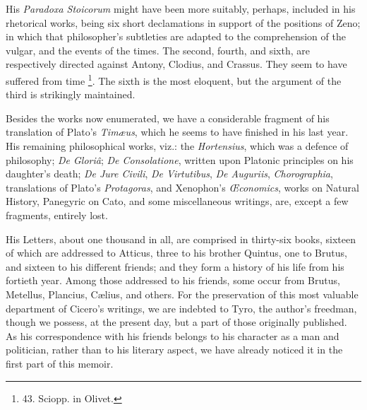 His \emph{Paradoxa Stoicorum}
might have been more suitably, perhaps, included in his rhetorical
works, being six short declamations in support of the positions of
Zeno; in which that philosopher's subtleties are adapted to the
comprehension of the vulgar, and the events of the times. The second,
fourth, and sixth, are respectively directed against Antony, Clodius,
and Crassus. They seem to have suffered from time \footnote{43.
Sciopp. in Olivet.}.
The sixth is the most eloquent, but the argument of the third is
strikingly maintained.

Besides the works now
enumerated, we have a considerable fragment of his translation of
Plato's \emph{Timæus}, which he seems to have finished in his last
year. His remaining philosophical works, viz.: the \emph{Hortensius},
which was a defence of philosophy; \emph{De Gloriâ}; \emph{De
Consolatione}, written upon Platonic principles on his daughter's
death; \emph{De Jure Civili}, \emph{De Virtutibus}, \emph{De Auguriis},
\emph{Chorographia}, translations of Plato's \emph{Protagoras}, and
Xenophon's \emph{Œconomics}, works on Natural History, Panegyric on
Cato, and some miscellaneous writings, are, except a few fragments,
entirely lost.

His Letters, about one
thousand in all, are comprised in thirty-six books, sixteen of which
are addressed to Atticus, three to his brother Quintus, one to Brutus,
and sixteen to his different friends; and they form a history of his
life from his fortieth year. Among those addressed to his friends,
some occur from Brutus, Metellus, Plancius, Cælius, and others. For
the preservation of this most valuable department of Cicero's
writings, we are indebted to Tyro, the author's freedman, though we
possess, at the present day, but a part of those originally published.
As his correspondence with his friends belongs to his character as a
man and politician, rather than to his literary aspect, we have
already noticed it in the first part of this memoir.

